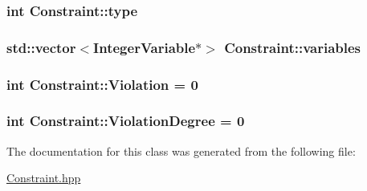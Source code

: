 \hypertarget{class_constraint_a377cd0c46beac0ad81d131b92824b626}{
\subsubsection[{type}]{\setlength{\rightskip}{0pt plus 5cm}int Constraint\-::type\hspace{0.3cm}{\ttfamily [protected]}}}\label{class_constraint_a377cd0c46beac0ad81d131b92824b626}
\hypertarget{class_constraint_abd73767b8640c514f582a9316a1ce792}{
\subsubsection[{variables}]{\setlength{\rightskip}{0pt plus 5cm}std\-::vector$<${\bf Integer\-Variable}$\ast$$>$ Constraint\-::variables\hspace{0.3cm}{\ttfamily [protected]}}}\label{class_constraint_abd73767b8640c514f582a9316a1ce792}
\hypertarget{class_constraint_ab80bb8ec253665f6572a94877579cdfb}{
\subsubsection[{Violation}]{\setlength{\rightskip}{0pt plus 5cm}int Constraint\-::\-Violation = 0\hspace{0.3cm}{\ttfamily [protected]}}}\label{class_constraint_ab80bb8ec253665f6572a94877579cdfb}
\hypertarget{class_constraint_a673b620b0be43337a301c407afc15133}{
\subsubsection[{Violation\-Degree}]{\setlength{\rightskip}{0pt plus 5cm}int Constraint\-::\-Violation\-Degree = 0\hspace{0.3cm}{\ttfamily [protected]}}}\label{class_constraint_a673b620b0be43337a301c407afc15133}


The documentation for this class was generated from the following file\-:\begin{DoxyCompactItemize}
\item 
\hyperlink{_constraint_8hpp}{Constraint.\-hpp}\end{DoxyCompactItemize}
